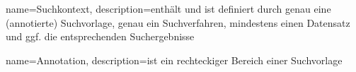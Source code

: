 {
name=Suchkontext,
description={enth\"alt und ist definiert durch genau eine (annotierte) Suchvorlage, genau ein Suchverfahren, mindestens einen Datensatz und ggf. die entsprechenden Suchergebnisse}
}

{
name=Annotation,
description={ist ein rechteckiger Bereich einer Suchvorlage}
}
